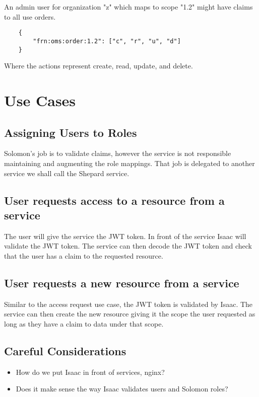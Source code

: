 \documentclass[11pt]{article}
\begin{document}
An admin user for organization "z" which maps to scope "1.2" might have claims to all 
use orders. 

\begin{lstlisting}
    {
        "frn:oms:order:1.2": ["c", "r", "u", "d"]
    }   
\end{lstlisting}

Where the actions represent create, read, update, and delete.

\section{Use Cases}
\subsection{Assigning Users to Roles}

Solomon's job is to validate claims, however the service is not responsible 
maintaining and augmenting the role mappings. That job is delegated to another
service we shall call the Shepard service.

\subsection{User requests access to a resource from a service}

The user will give the service the JWT token. In front of the service Isaac
will validate the JWT token. The service can then decode the JWT token and 
check that the user has a claim to the requested resource. 

\subsection{User requests a new resource from a service}

Similar to the access request use case, the JWT token is validated by Isaac.
The service can then create the new resource giving it the scope the user requested
as long as they have a claim to data under that scope.

\subsection{Careful Considerations}

\begin{itemize}
    \item How do we put Isaac in front of services, nginx?
    \item Does it make sense the way Isaac validates users and Solomon roles?
\end{itemize}
\end{document}
